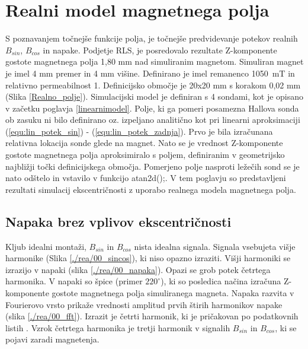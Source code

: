 \chapter{Realni model magnetnega polja}
S poznavanjem točnejše funkcije polja, je točnejše predvidevanje potekov realnih $B_{sin}$, $B_{cos}$ in napake. Podjetje RLS,  je posredovalo rezultate Z-komponente gostote magnetnega polja 1,80 mm nad simuliranim magnetom. Simuliran magnet je imel 4 mm premer in 4 mm višine. Definirano je imel remanenco 1050~mT in relativno permeabilnost 1.  Definicijsko območje  je 20x20 mm s korakom 0,02 mm (Slika \ref{Realno_polje}).
Simulacijski model je definiran s 4 sondami, kot je opisano v začetku poglavja \ref{linearnimodel}.
Polje, ki ga pomeri posamezna Hallova sonda ob zasuku ni bilo definirano oz. izpeljano analitično kot pri linearni aproksimaciji (\ref{equ:lin_potek_sin}) - (\ref{equ:lin_potek_zadnja}).  Prvo je bila izračunana relativna lokacija sonde glede na magnet. Nato se je vrednost Z-komponente gostote magnetnega polja  aproksimiralo s poljem, definiranim v geometrijsko najbližji točki definicijskega območja.
Pomerjeno polje nasproti ležečih sond se je nato odštelo in vstavilo v funkcijo atan2d();.
V tem poglavju so predstavljeni rezultati simulacij ekscentričnosti z uporabo realnega modela magnetnega polja.
\section{Napaka brez vplivov ekscentričnosti}
Kljub idealni montaži, $B_{sin}$ in $B_{cos}$ nista idealna signala.  Signala vsebujeta višje harmonike (Slika \ref{./rea/00_sincos}), ki niso opazno izraziti. Višji harmoniki se izrazijo v napaki (slika \ref{./rea/00_napaka}). Opazi se grob potek četrtega harmonika. V napaki so špice (primer $220^{\circ}$), ki so posledica načina izračuna Z-komponente gostote  magnetnega polja simuliranega magneta. Napaka razvita v Fourierovo vrsto prikaže vrednosti amplitud prvih štirih harmonikov napake (slika \ref{./rea/00_fft}). Izrazit je četrti harmonik, ki je pričakovan po podatkovnih listih \cite{AM8192}. Vzrok četrtega harmonika je tretji harmonik v signalih  $B_{sin}$ in $B_{cos}$, ki se pojavi zaradi magnetenja.
\newpage
